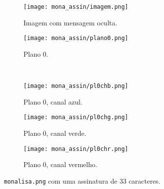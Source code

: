 \begin{figure}[H]
    \centering
    \begin{subfigure}{0.4\textwidth}
        \centering
        \texttt{[image: mona\_assin/imagem.png]}
        \caption{Imagem com mensagem oculta.}
        \label{fig:assinatura:imagem}
    \end{subfigure}%
    \begin{subfigure}{0.4\textwidth}
        \centering
        \texttt{[image: mona\_assin/plano0.png]}
        \caption{Plano 0.}
        \label{fig:assinatura:plano}
    \end{subfigure}\\[8pt]
    \begin{subfigure}{0.28\textwidth}
        \centering
        \texttt{[image: mona\_assin/pl0chb.png]}
        \caption{Plano 0, canal azul.}
        \label{fig:assinatura:blue}
    \end{subfigure}%
    \begin{subfigure}{0.28\textwidth}
        \centering
        \texttt{[image: mona\_assin/pl0chg.png]}
        \caption{Plano 0, canal verde.}
        \label{fig:assinatura:green}
    \end{subfigure}%
    \begin{subfigure}{0.28\textwidth}
        \centering
        \texttt{[image: mona\_assin/pl0chr.png]}
        \caption{Plano 0, canal vermelho.}
        \label{fig:assinatura:red}
    \end{subfigure}%

    \caption{\texttt{monalisa.png} com uma assinatura de 33 caracteres.}
    \label{fig:assinatura}
\end{figure}